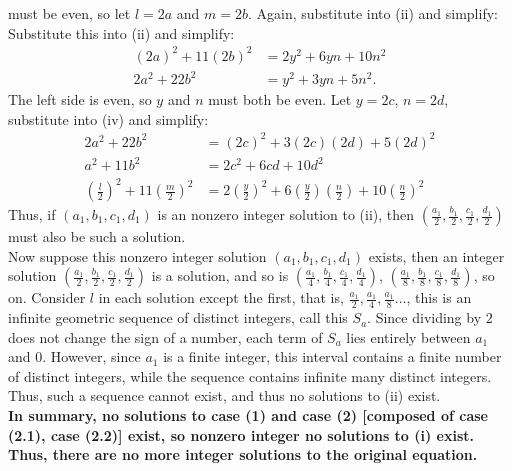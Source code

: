 \documentclass{article}
\begin{document}
must be even, so let $l = 2a$ and $m = 2b$. Again, substitute into (ii) and simplify:
Substitute this into (ii) and simplify:
\begin{align*}
    (2a)^2 + 11(2b)^2 &= 2y^2 + 6yn + 10n^2 \\
    2a^2 + 22b^2 &= y^2 + 3yn + 5n^2. \tag{iv}
\end{align*}
The left side is even, so $y$ and $n$ must both be even. Let $y = 2c$, $n = 2d$, substitute into (iv) and simplify:
\begin{align*}
    2a^2 + 22b^2 &= (2c)^2 + 3(2c)(2d) + 5(2d)^2 \\
    a^2 + 11b^2 &= 2c^2 + 6cd + 10d^2 \\
    \left( \frac{l}{2} \right)^2 + 11\left( \frac{m}{2} \right)^2 &= 2\left( \frac{y}{2} \right)^2 + 6\left( \frac{y}{2} \right)\left( \frac{n}{2} \right) + 10\left( \frac{n}{2} \right)^2
\end{align*}
Thus, if $(a_1,b_1,c_1,d_1)$ is an nonzero integer solution to (ii), then $\left( \frac{a_1}{2}, \frac{b_1}{2}, \frac{c_1}{2}, \frac{d_1}{2} \right)$ must also be such a solution. \\
Now suppose this nonzero integer solution $(a_1,b_1,c_1,d_1)$ exists, then an integer solution $\left( \frac{a_1}{2}, \frac{b_1}{2}, \frac{c_1}{2}, \frac{d_1}{2} \right)$ is a solution, and so is $\left( \frac{a_1}{4}, \frac{b_1}{4}, \frac{c_1}{4}, \frac{d_1}{4} \right)$, $\left( \frac{a_1}{8}, \frac{b_1}{8}, \frac{c_1}{8}, \frac{d_1}{8} \right)$, so on.
Consider $l$ in each solution except the first, that is, $\frac{a_1}{2}, \frac{a_1}{4}, \frac{a_1}{8} \dots$, this is an infinite geometric sequence of distinct integers, call this $S_a$.
Since dividing by $2$ does not change the sign of a number, each term of $S_a$ lies entirely between $a_1$ and $0$. However, since $a_1$ is a finite integer, this interval contains a finite number of distinct integers, while the sequence contains infinite many distinct integers. Thus, such a sequence cannot exist, and thus no solutions to (ii) exist. \\

\textbf{In summary, no solutions to case (1) and case (2) [composed of case (2.1), case (2.2)] exist, so nonzero integer no solutions to (i) exist. Thus, there are no more integer solutions to the original equation.}
\end{document}
